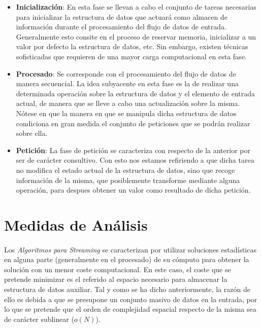 \documentclass{subfiles}
\begin{document}
      \begin{itemize}

        \item \textbf{Inicialización}: En esta fase se llevan a cabo el conjunto de tareas necesarias para inicializar la estructura de datos que actuará como almacen de información durante el procesamiento del flujo de datos de entrada. Generalmente esto consite en el proceso de reservar memoria, inicializar a un valor por defecto la estructura de datos, etc. Sin embargo, existen técnicas sofisticadas que requieren de una mayor carga computacional en esta fase.

        \item \textbf{Procesado}: Se corresponde con el procesamiento del flujo de datos de manera secuencial. La idea subyacente en esta fase es la de realizar una determinada operación sobre la estructura de datos y el elemento de entrada actual, de manera que se lleve a cabo una actualización sobre la misma. Nótese en que la manera en que se manipula dicha estructura de datos condiciona en gran medida el conjunto de peticiones que se podrán realizar sobre ella.

        \item \textbf{Petición}: La fase de petición se caracteriza con respecto de la anterior por ser de carácter consultivo. Con esto nos estamos refiriendo a que dicha tarea no modifica el estado actual de la estructura de datos, sino que recoge información de la misma, que posiblemente transforme mediante alguna operación, para despues obtener un valor como resultado de dicha petición.

      \end{itemize}

    \section{Medidas de Análisis}
    \label{sec:streaming_analysis}

      \paragraph{}
      Los \emph{Algoritmos para Streaming} se caracterizan por utilizar soluciones estadísticas en alguna parte (generalmente en el procesado) de su cómputo para obtener la solución con un menor coste computacional. En este caso, el coste que se pretende minimizar es el referido al espacio necesario para almacenar la estructura de datos auxiliar. Tal y como se ha dicho anteriormente, la razón de ello es debida a que se presupone un conjunto masivo de datos en la entrada, por lo que se pretende que el orden de complejidad espacial respecto de la misma sea de carácter sublinear ($o(N)$).
\end{document}
